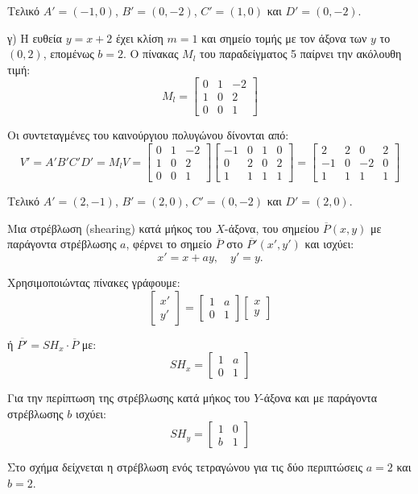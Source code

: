 \begin{solution}
Τελικό $A' = (-1, 0)$, $B' = (0, -2)$, $C' = (1, 0)$ και $D' = (0, -2)$.

γ) Η ευθεία $y=x+2$ έχει κλίση $m=1$ και σημείο τομής με τον άξονα των $y$ το $(0,2)$, επομένως $b=2$. Ο πίνακας $M_l$ του παραδείγματος 5 παίρνει την ακόλουθη τιμή:
\[
M_l = \begin{bmatrix}
0 & 1 & -2 \\
1 & 0 & 2 \\
0 & 0 & 1
\end{bmatrix}
\]

Οι συντεταγμένες του καινούργιου πολυγώνου δίνονται από:
\[
V' = A'B'C'D' = M_l V = \begin{bmatrix}
0 & 1 & -2 \\
1 & 0 & 2 \\
0 & 0 & 1
\end{bmatrix}
\begin{bmatrix}
-1 & 0 & 1 & 0 \\
0 & 2 & 0 & 2 \\
1 & 1 & 1 & 1
\end{bmatrix} = \begin{bmatrix}
2 & 2 & 0 & 2 \\
-1 & 0 & -2 & 0 \\
1 & 1 & 1 & 1
\end{bmatrix}
\]

Τελικό $A' = (2, -1)$, $B' = (2, 0)$, $C' = (0, -2)$ και $D' = (2, 0)$.

Μια στρέβλωση (shearing) κατά μήκος του $X$-άξονα, του σημείου $\overline{P}(x, y)$ με παράγοντα στρέβλωσης $a$, φέρνει το σημείο $\overline{P}$ στο $\overline{P'}(x', y')$ και ισχύει:
\[
x' = x + ay, \quad y' = y .
\]

Χρησιμοποιώντας πίνακες γράφουμε:
\[
\begin{bmatrix}
x' \\
y'
\end{bmatrix} = \begin{bmatrix}
1 & a \\
0 & 1
\end{bmatrix}
\begin{bmatrix}
x \\
y
\end{bmatrix}
\]

ή \(\overline{P'} = SH_x \cdot \overline{P}\) με:
\[
SH_x = \begin{bmatrix}
1 & a \\
0 & 1
\end{bmatrix}
\]

Για την περίπτωση της στρέβλωσης κατά μήκος του $Y$-άξονα και με παράγοντα στρέβλωσης $b$ ισχύει:
\[
SH_y = \begin{bmatrix}
1 & 0 \\
b & 1
\end{bmatrix}
\]


Στο σχήμα  δείχνεται η στρέβλωση ενός τετραγώνου για τις δύο περιπτώσεις $a=2$ και $b=2$.

%

\end{solution}
